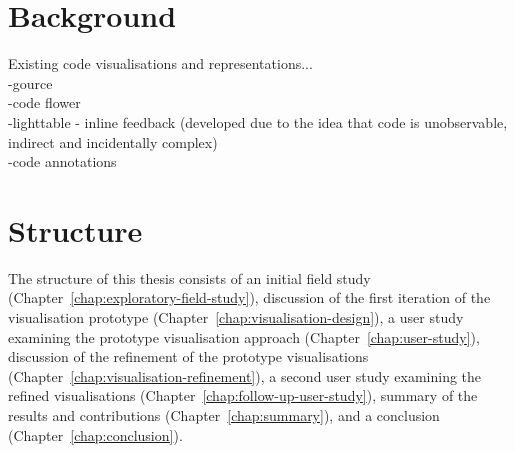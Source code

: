 \section{Background}

Existing code visualisations and representations...\\
-gource~\cite{Caudwell2010}\\
-code flower\\
-lighttable - inline feedback (developed due to the idea that code is unobservable, indirect and incidentally complex) \\
-code annotations~\cite{Swift2013}



\section{Structure}

The structure of this thesis consists of an initial field study (Chapter~\ref{chap:exploratory-field-study}), discussion of the first iteration of the visualisation prototype (Chapter~\ref{chap:visualisation-design}), a user study examining the prototype visualisation approach (Chapter~\ref{chap:user-study}), discussion of the refinement of the prototype visualisations (Chapter~\ref{chap:visualisation-refinement}), a second user study examining the refined visualisations (Chapter~\ref{chap:follow-up-user-study}), summary of the results and contributions (Chapter~\ref{chap:summary}), and a conclusion (Chapter~\ref{chap:conclusion}).





